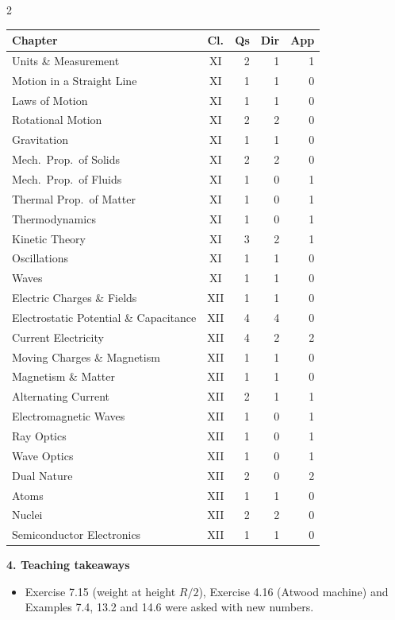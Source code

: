 \begin{multicols}{2}
{\footnotesize\begin{tabular}{@{}p{4.7cm}c@{\,}r@{\,}r@{\,}r@{}}\toprule
Chapter & Cl. & Qs & Dir & App\\\midrule
Units \& Measurement & XI & 2 & 1 & 1\\
Motion in a Straight Line & XI & 1 & 1 & 0\\
Laws of Motion & XI & 1 & 1 & 0\\
Rotational Motion & XI & 2 & 2 & 0\\
Gravitation & XI & 1 & 1 & 0\\
Mech.\ Prop.\ of Solids & XI & 2 & 2 & 0\\
Mech.\ Prop.\ of Fluids & XI & 1 & 0 & 1\\
Thermal Prop.\ of Matter & XI & 1 & 0 & 1\\
Thermodynamics & XI & 1 & 0 & 1\\
Kinetic Theory & XI & 3 & 2 & 1\\
Oscillations & XI & 1 & 1 & 0\\
Waves & XI & 1 & 1 & 0\\
Electric Charges \& Fields & XII & 1 & 1 & 0\\
Electrostatic Potential \& Capacitance & XII & 4 & 4 & 0\\
Current Electricity & XII & 4 & 2 & 2\\
Moving Charges \& Magnetism & XII & 1 & 1 & 0\\
Magnetism \& Matter & XII & 1 & 1 & 0\\
Alternating Current & XII & 2 & 1 & 1\\
Electromagnetic Waves & XII & 1 & 0 & 1\\
Ray Optics & XII & 1 & 0 & 1\\
Wave Optics & XII & 1 & 0 & 1\\
Dual Nature & XII & 2 & 0 & 2\\
Atoms & XII & 1 & 1 & 0\\
Nuclei & XII & 2 & 2 & 0\\
Semiconductor Electronics & XII & 1 & 1 & 0\\
\bottomrule\end{tabular}}\par\medskip
\textbf{\color{crimson}4. Teaching takeaways}\par\smallskip
{\footnotesize\begin{itemize}[leftmargin=1em,nosep]
\item Exercise 7.15 (weight at height $R/2$), Exercise 4.16 (Atwood machine) and Examples 7.4, 13.2 and 14.6 were asked with new numbers.

\end{itemize}}
\end{multicols}
